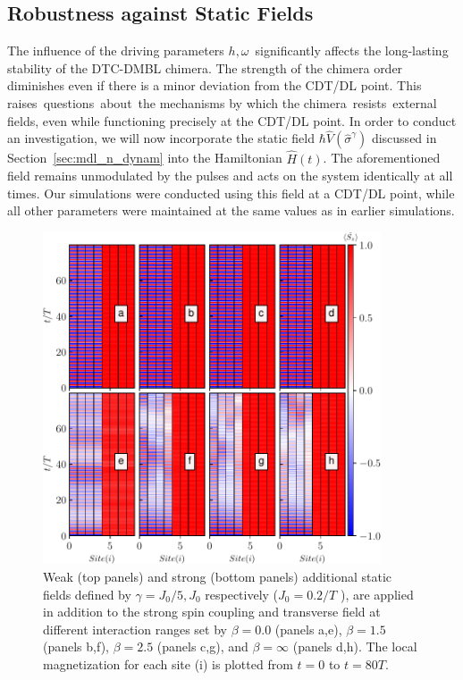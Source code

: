 \documentclass[12pt]{iopart}
\begin{document}
\subsection{\label{sec:level43} Robustness against Static Fields}
The influence of the driving parameters $h, \omega$ significantly affects the long-lasting stability of the DTC-DMBL chimera. The strength of the chimera order diminishes even if there is a minor deviation from the CDT/DL point. This raises questions about the mechanisms by which the chimera resists external fields, even while functioning precisely at the CDT/DL point.
In order to conduct an investigation, we will now incorporate the static field $\hbar\hat{V}(\hat{\sigma}^{\gamma})$ discussed in Section~\ref{sec:mdl_n_dynam} into the Hamiltonian $\hat{H}(t)$. The aforementioned field remains unmodulated by the pulses and acts on the system identically at all times. Our simulations were conducted using this field at a CDT/DL point, while all other parameters were maintained at the same values as in earlier simulations. 
\begin{figure}
    \begin{center}
        \includegraphics[width=10cm]{robustness_N_8.pdf}
    \end{center}
    \caption{Weak (top panels) and strong (bottom panels) additional static fields defined by $\gamma = J_0/5, J_0$ respectively ($J_0=0.2/T$ ), are applied in addition to the strong spin coupling and transverse field at different interaction ranges set by $\beta = 0.0$ (panels a,e), $\beta= 1.5$ (panels b,f), $\beta=2.5$ (panels c,g), and $\beta= \infty$ (panels d,h). The local magnetization for each site (i) is plotted from $t=0$ to $t=80 T$.}
    \label{Fig:robustness}
\end{figure}
\end{document}
